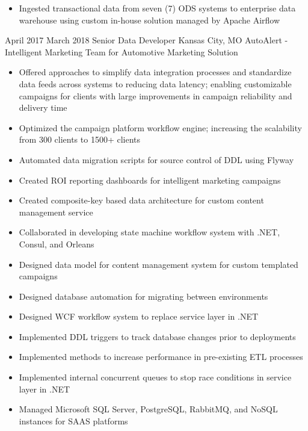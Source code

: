
\ExperienceExpanded
{
    \begin{itemize}
        \item Ingested transactional data from seven (7) ODS systems to
        enterprise data warehouse using custom in-house solution managed by
        Apache Airflow
    \end{itemize}
}

\ProjectExperience
{April 2017}
{March 2018}
{Senior Data Developer}
{Kansas City, MO}
{AutoAlert - Intelligent Marketing Team for Automotive Marketing Solution}
{
    \begin{itemize}
        \item Offered approaches to simplify data integration processes and
        standardize data feeds across systems to reducing data latency; enabling
        customizable campaigns for clients with large improvements in campaign
        reliability and delivery time
        \item Optimized the campaign platform workflow engine; increasing the
        scalability from 300 clients to 1500+ clients
        \item Automated data migration scripts for source control of DDL using
        Flyway
        \item Created ROI reporting dashboards for intelligent marketing
        campaigns
        \item Created composite-key based data architecture for custom content
        management service
    \end{itemize}
}
{
    \begin{itemize}
        \item Collaborated in developing state machine workflow system with
        .NET, Consul, and Orleans
        \item Designed data model for content management system for custom
        templated campaigns
        \item Designed database automation for migrating between environments
        \item Designed WCF workflow system to replace service layer in .NET
    \end{itemize}
}
{
    \begin{itemize}
        \item Implemented DDL triggers to track database changes prior to
        deployments
        \item Implemented methods to increase performance in pre-existing ETL
        processes
        \item Implemented internal concurrent queues to stop race conditions in
        service layer in .NET
        \item Managed Microsoft SQL Server, PostgreSQL, RabbitMQ, and NoSQL
        instances for SAAS platforms
    \end{itemize}
}

